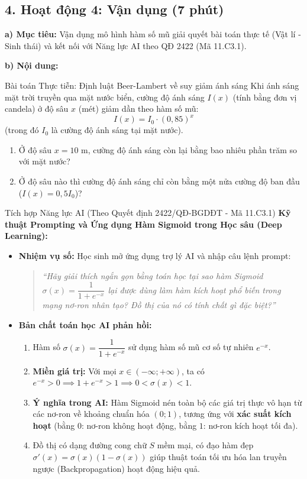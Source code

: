 \documentclass[12pt, a4paper]{article}
\begin{document}
\subsection*{4. Hoạt động 4: Vận dụng (7 phút)}

\noindent \textbf{a) Mục tiêu:}
Vận dụng mô hình hàm số mũ giải quyết bài toán thực tế (Vật lí - Sinh thái) và kết nối với Năng lực AI theo QĐ 2422 (Mã 11.C3.1).

\noindent \textbf{b) Nội dung:}
\begin{stembox}{Bài toán Thực tiễn: Định luật Beer-Lambert về suy giảm ánh sáng}
Khi ánh sáng mặt trời truyền qua mặt nước biển, cường độ ánh sáng $I(x)$ (tính bằng đơn vị candela) ở độ sâu $x$ (mét) giảm dần theo hàm số mũ:
$$I(x) = I_0 \cdot (0{,}85)^x$$
(trong đó $I_0$ là cường độ ánh sáng tại mặt nước).
\begin{enumerate}[leftmargin=0.6cm]
    \item Ở độ sâu $x = 10\text{ m}$, cường độ ánh sáng còn lại bằng bao nhiêu phần trăm so với mặt nước?
    \item Ở độ sâu nào thì cường độ ánh sáng chỉ còn bằng một nửa cường độ ban đầu ($I(x) = 0{,}5 I_0$)?
\end{enumerate}
\end{stembox}

\begin{aibox}{Tích hợp Năng lực AI (Theo Quyết định 2422/QĐ-BGDĐT - Mã 11.C3.1)}
\textbf{Kỹ thuật Prompting và Ứng dụng Hàm Sigmoid trong Học sâu (Deep Learning):}
\begin{itemize}[leftmargin=0.6cm]
    \item \textbf{Nhiệm vụ số:} Học sinh mở ứng dụng trợ lý AI và nhập câu lệnh prompt:
    \begin{quote}
        \textit{``Hãy giải thích ngắn gọn bằng toán học tại sao hàm Sigmoid $\sigma(x) = \dfrac{1}{1 + e^{-x}}$ lại được dùng làm hàm kích hoạt phổ biến trong mạng nơ-ron nhân tạo? Đồ thị của nó có tính chất gì đặc biệt?''}
    \end{quote}
    \item \textbf{Bản chất toán học AI phản hồi:}
    \begin{enumerate}[leftmargin=0.6cm]
        \item Hàm số $\sigma(x) = \dfrac{1}{1 + e^{-x}}$ sử dụng hàm số mũ cơ số tự nhiên $e^{-x}$.
        \item \textbf{Miền giá trị:} Với mọi $x \in (-\infty; +\infty)$, ta có $e^{-x} > 0 \implies 1 + e^{-x} > 1 \implies 0 < \sigma(x) < 1$.
        \item \textbf{Ý nghĩa trong AI:} Hàm Sigmoid nén toàn bộ các giá trị thực vô hạn từ các nơ-ron về khoảng chuẩn hóa $(0; 1)$, tương ứng với \textbf{xác suất kích hoạt} (bằng $0$: nơ-ron không hoạt động, bằng $1$: nơ-ron kích hoạt tối đa).
        \item Đồ thị có dạng đường cong chữ $S$ mềm mại, có đạo hàm đẹp $\sigma'(x) = \sigma(x)(1 - \sigma(x))$ giúp thuật toán tối ưu hóa lan truyền ngược (Backpropagation) hoạt động hiệu quả.
    \end{enumerate}
\end{itemize}
\end{aibox}
\end{document}
